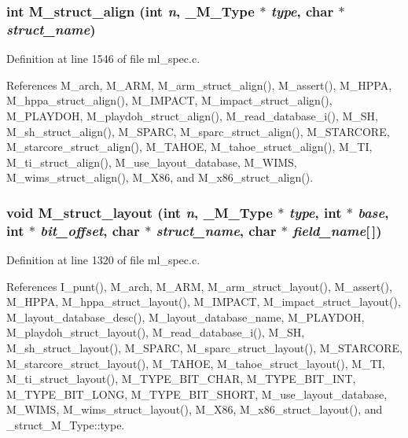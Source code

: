 \subsubsection{\setlength{\rightskip}{0pt plus 5cm}int M\_\-struct\_\-align (int {\em n}, \bf{\_\-M\_\-Type} $\ast$ {\em type}, char $\ast$ {\em struct\_\-name})}\label{ml__spec_8c_a2ee4c74410638b0628ecf3d8ee42eb8}




Definition at line 1546 of file ml\_\-spec.c.

References M\_\-arch, M\_\-ARM, M\_\-arm\_\-struct\_\-align(), M\_\-assert(), M\_\-HPPA, M\_\-hppa\_\-struct\_\-align(), M\_\-IMPACT, M\_\-impact\_\-struct\_\-align(), M\_\-PLAYDOH, M\_\-playdoh\_\-struct\_\-align(), M\_\-read\_\-database\_\-i(), M\_\-SH, M\_\-sh\_\-struct\_\-align(), M\_\-SPARC, M\_\-sparc\_\-struct\_\-align(), M\_\-STARCORE, M\_\-starcore\_\-struct\_\-align(), M\_\-TAHOE, M\_\-tahoe\_\-struct\_\-align(), M\_\-TI, M\_\-ti\_\-struct\_\-align(), M\_\-use\_\-layout\_\-database, M\_\-WIMS, M\_\-wims\_\-struct\_\-align(), M\_\-X86, and M\_\-x86\_\-struct\_\-align().
\subsubsection{\setlength{\rightskip}{0pt plus 5cm}void M\_\-struct\_\-layout (int {\em n}, \bf{\_\-M\_\-Type} $\ast$ {\em type}, int $\ast$ {\em base}, int $\ast$ {\em bit\_\-offset}, char $\ast$ {\em struct\_\-name}, char $\ast$ {\em field\_\-name}[$\,$])}\label{ml__spec_8c_ed813e7d3b3de9b8b73f5951e8d49c3b}




Definition at line 1320 of file ml\_\-spec.c.

References I\_\-punt(), M\_\-arch, M\_\-ARM, M\_\-arm\_\-struct\_\-layout(), M\_\-assert(), M\_\-HPPA, M\_\-hppa\_\-struct\_\-layout(), M\_\-IMPACT, M\_\-impact\_\-struct\_\-layout(), M\_\-layout\_\-database\_\-desc(), M\_\-layout\_\-database\_\-name, M\_\-PLAYDOH, M\_\-playdoh\_\-struct\_\-layout(), M\_\-read\_\-database\_\-i(), M\_\-SH, M\_\-sh\_\-struct\_\-layout(), M\_\-SPARC, M\_\-sparc\_\-struct\_\-layout(), M\_\-STARCORE, M\_\-starcore\_\-struct\_\-layout(), M\_\-TAHOE, M\_\-tahoe\_\-struct\_\-layout(), M\_\-TI, M\_\-ti\_\-struct\_\-layout(), M\_\-TYPE\_\-BIT\_\-CHAR, M\_\-TYPE\_\-BIT\_\-INT, M\_\-TYPE\_\-BIT\_\-LONG, M\_\-TYPE\_\-BIT\_\-SHORT, M\_\-use\_\-layout\_\-database, M\_\-WIMS, M\_\-wims\_\-struct\_\-layout(), M\_\-X86, M\_\-x86\_\-struct\_\-layout(), and \_\-struct\_\-M\_\-Type::type.
